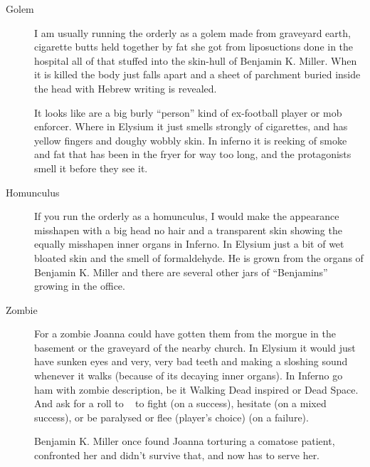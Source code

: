 \documentclass[bg-full]{resources/stylesheets/kult}
\begin{document}
\begin{description}
  \item[Golem] I am usually running the orderly as a golem made from graveyard earth, cigarette butts held together by fat she got from
    liposuctions done in the hospital all of that stuffed into the skin-hull of Benjamin K. Miller.  When it is killed the body
    just falls apart and a sheet of parchment buried inside the head with Hebrew writing is revealed.

    It looks like are a big burly “person” kind of ex-football player or mob enforcer.  Where in Elysium it just smells strongly of
    cigarettes, and has yellow fingers and doughy wobbly skin.  In inferno it is reeking of smoke and fat that has been in the
    fryer for way too long, and the protagonists smell it before they see it.

  \item[Homunculus] If you run the orderly as a homunculus, I would make the appearance misshapen with a big head no hair and a
    transparent skin showing the equally misshapen inner organs in Inferno.  In Elysium just a bit of wet bloated skin and
    the smell of formaldehyde.  He is grown from the organs of Benjamin K. Miller and there are several other jars of
    “Benjamins” growing in the office.

  \item[Zombie] For a zombie Joanna could have gotten them from the morgue in the basement or the graveyard of the nearby church.
    In Elysium it would just have sunken eyes and very, very bad teeth and making a sloshing sound whenever it walks (because
    of its decaying inner organs).  In Inferno go ham with zombie description, be it Walking Dead inspired or Dead Space.  And
    ask for a roll to ~ to fight (on a success), hesitate (on a mixed success), or be
    paralysed or flee (player's choice) (on a failure).

    Benjamin K. Miller once found Joanna torturing a comatose patient, confronted her and didn't survive that, and now has to serve her.
\end{description}

\end{document}
